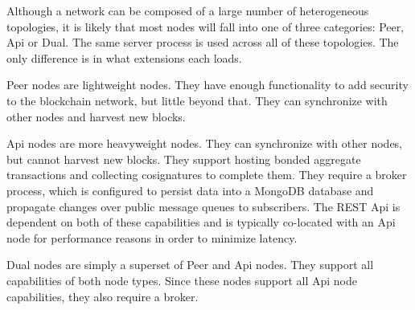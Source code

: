Although a network can be composed of a large number of heterogeneous topologies, it is likely that most nodes will fall into one of three categories: Peer, Api or Dual.
The same server process is used across all of these topologies.
The only difference is in what extensions each loads.

Peer nodes are lightweight nodes.
They have enough functionality to add security to the blockchain network, but little beyond that.
They can synchronize with other nodes and harvest new blocks.

Api nodes are more heavyweight nodes.
They can synchronize with other nodes, but cannot harvest new blocks.
They support hosting bonded aggregate transactions and collecting cosignatures to complete them.
They require a broker process, which is configured to persist data into a MongoDB database and propagate changes over public message queues to subscribers.
The REST Api is dependent on both of these capabilities and is typically co-located with an Api node for performance reasons in order to minimize latency.

Dual nodes are simply a superset of Peer and Api nodes.
They support all capabilities of both node types.
Since these nodes support all Api node capabilities, they also require a broker.
